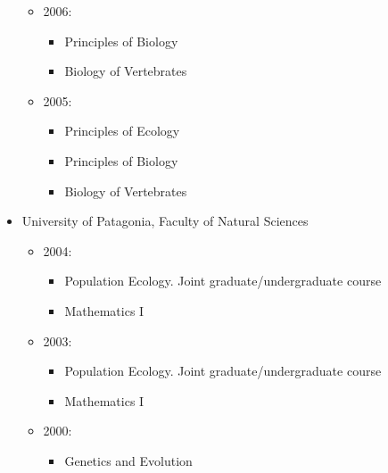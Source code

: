 \documentclass{res}
\begin{document}
\begin{resume}
\begin{itemize}
	\begin{itemize}
    	\item[] 2006:
	    \begin{itemize}
		    \item[] Principles of Biology
     		\item[] Biology of Vertebrates
	    \end{itemize}
    \end{itemize} 

	\begin{itemize}
    	\item[] 2005:
    	\begin{itemize}
	    	\item[] Principles of Ecology
		    \item[] Principles of Biology
	    	\item[] Biology of Vertebrates
    	\end{itemize}
    \pagebreak
    \end{itemize} 
    \item[] University of Patagonia, Faculty of Natural Sciences
	\begin{itemize}
    	\item[] 2004:
	    \begin{itemize}
	    	\item[] Population Ecology. Joint graduate/undergraduate course
		    \item[] Mathematics I
	    \end{itemize}
    \end{itemize}    
    
   	\begin{itemize}
    	\item[] 2003:
    	\begin{itemize}
    		\item[] Population Ecology. Joint graduate/undergraduate course
    		\item[] Mathematics I
    	\end{itemize}
    \end{itemize}    
    
   	\begin{itemize}
    	\item[] 2000:
	    \begin{itemize}
    		\item[] Genetics and Evolution
	    \end{itemize}
    \end{itemize}      
\end{itemize}
 

\end{resume}
\end{document}
